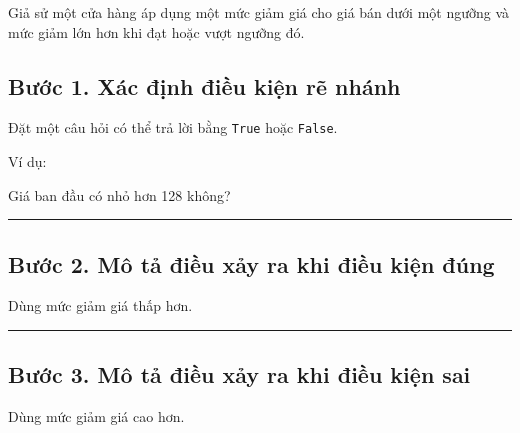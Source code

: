 \documentclass[
  11pt,
  a4paper,
]{article}
\newenvironment{Shaded}{}{}
\newcommand{\NormalTok}[1]{#1}
\begin{document}
Giả sử một cửa hàng áp dụng một mức giảm giá cho giá bán dưới một ngưỡng
và mức giảm lớn hơn khi đạt hoặc vượt ngưỡng đó.

\subsection{Bước 1. Xác định điều kiện rẽ
nhánh}\label{bux1b0ux1edbc-1.-xuxe1c-ux111ux1ecbnh-ux111iux1ec1u-kiux1ec7n-rux1ebd-nhuxe1nh}

Đặt một câu hỏi có thể trả lời bằng \texttt{True} hoặc \texttt{False}.

Ví dụ:

\begin{Shaded}
\begin{Highlighting}[]
\NormalTok{Giá ban đầu có nhỏ hơn 128 không?}
\end{Highlighting}
\end{Shaded}

\begin{center}\rule{0.5\linewidth}{0.5pt}\end{center}

\subsection{Bước 2. Mô tả điều xảy ra khi điều kiện
đúng}\label{bux1b0ux1edbc-2.-muxf4-tux1ea3-ux111iux1ec1u-xux1ea3y-ra-khi-ux111iux1ec1u-kiux1ec7n-ux111uxfang}

\begin{Shaded}
\begin{Highlighting}[]
\NormalTok{Dùng mức giảm giá thấp hơn.}
\end{Highlighting}
\end{Shaded}

\begin{center}\rule{0.5\linewidth}{0.5pt}\end{center}

\subsection{Bước 3. Mô tả điều xảy ra khi điều kiện
sai}\label{bux1b0ux1edbc-3.-muxf4-tux1ea3-ux111iux1ec1u-xux1ea3y-ra-khi-ux111iux1ec1u-kiux1ec7n-sai}

\begin{Shaded}
\begin{Highlighting}[]
\NormalTok{Dùng mức giảm giá cao hơn.}
\end{Highlighting}
\end{Shaded}
\end{document}
